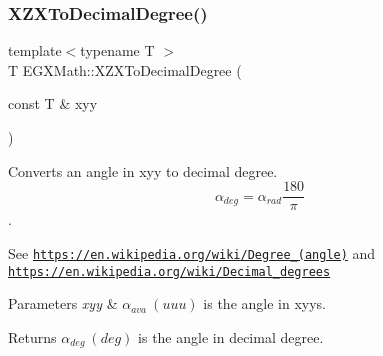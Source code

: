 \subsubsection{\texorpdfstring{X\+Z\+X\+To\+Decimal\+Degree()}{XZXToDecimalDegree()}}
{\footnotesize\ttfamily template$<$typename T $>$ \\
T E\+G\+X\+Math\+::\+X\+Z\+X\+To\+Decimal\+Degree (\begin{DoxyParamCaption}\item[{const T \&}]{xyy }\end{DoxyParamCaption})}



Converts an angle in xyy to decimal degree. \[\alpha_{deg}=\alpha_{rad}\frac{180}{\pi}\]. 

See \href{https://en.wikipedia.org/wiki/Degree_(angle)}{\tt https\+://en.\+wikipedia.\+org/wiki/\+Degree\+\_\+(angle)} and \href{https://en.wikipedia.org/wiki/Decimal_degrees}{\tt https\+://en.\+wikipedia.\+org/wiki/\+Decimal\+\_\+degrees} 
\begin{DoxyParams}{Parameters}
{\em xyy} & $\alpha_{ava}\ (uuu)$ is the angle in xyys. \\
\hline
\end{DoxyParams}
\begin{DoxyReturn}{Returns}
$\alpha_{deg}\ (deg)$ is the angle in decimal degree. 
\end{DoxyReturn}
